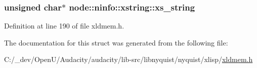 \subsubsection[{\texorpdfstring{xs\+\_\+string}{xs_string}}]{\setlength{\rightskip}{0pt plus 5cm}unsigned char$\ast$ node\+::ninfo\+::xstring\+::xs\+\_\+string}\hypertarget{structnode_1_1ninfo_1_1xstring_af25d1827c5a32e85c20b0efd06c46cee}{}\label{structnode_1_1ninfo_1_1xstring_af25d1827c5a32e85c20b0efd06c46cee}


Definition at line 190 of file xldmem.\+h.



The documentation for this struct was generated from the following file\+:\begin{DoxyCompactItemize}
\item 
C\+:/\+\_\+dev/\+Open\+U/\+Audacity/audacity/lib-\/src/libnyquist/nyquist/xlisp/\hyperlink{xldmem_8h}{xldmem.\+h}\end{DoxyCompactItemize}
